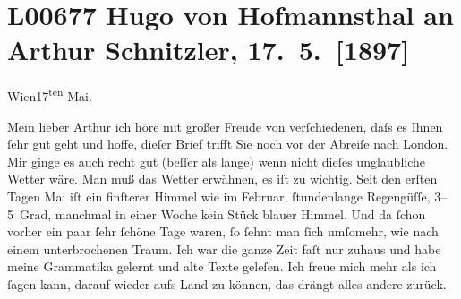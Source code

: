 

\section[Hugo von Hofmannsthal an Arthur Schnitzler, 17. 5. {[}1897{]}]{L00677 Hugo von Hofmannsthal an Arthur Schnitzler, 17. 5. {[}1897{]}}
\nopagebreak{}
\rehead{ }\normalsize\beginnumbering{}
\toendnotes[C]{\smallbreak\pagebreak[2]}
\toendnotes[C]{\smallbreak}
\pstart
           \raggedleft{}{\pb}Wien17\textsuperscript{ten} Mai.\pend
           
\pstart{}Mein lieber Arthur\pend\vspace{0.5em}
\pstart
           ich höre mit großer Freude von verſchiedenen, daſs es Ihnen{ }ſehr gut  geht und hoffe, dieſer Brief trifft Sie noch vor der
               Abreiſe nach London. Mir ginge es auch recht gut
               (beſſer als lange) wenn nicht dieſes unglaubliche Wetter wäre. Man muß das Wetter
               erwähnen, es iſt {\pb}zu wichtig. Seit
               den erſten Tagen Mai iſt ein finſterer Himmel wie im Februar,{ }ſtundenlange Regengüſſe, 3–5 Grad, manchmal in einer Woche kein Stück blauer Himmel.
               Und da{ }ſchon vorher ein paar{ }ſehr{ }ſchöne Tage waren,{ }ſo{ }ſehnt man{ }ſich umſomehr, wie
               nach einem unterbrochenen Traum. Ich war die ganze Zeit faſt nur zuhaus und habe
               meine Grammatika gelernt {\pb}und alte
               Texte geleſen. Ich freue mich mehr als ich{ }ſagen kann, darauf wieder aufs Land zu
               können, das drängt alles andere zurück.\pend
           
